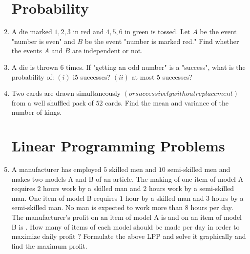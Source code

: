 \documentclass[12pt,-letter paper]{article}
\providecommand{\brak}[1]{\ensuremath{\left(#1\right)}}
\providecommand{\brak}[1]{\ensuremath{\left(#1\right)}}
\begin{document}
\begin{enumerate}
\section{Probability}
\item A die marked $1, 2, 3$ in red and $4, 5, 6$ in green is tossed. Let $A$ be the event "number is even" and $B$ be the event "number is marked red." Find whether the events $A$ and $B$ are independent or not.
\item A die is thrown 6 times. If "getting an odd number" is a "success", what is the probability of:
\brak{i} i5 successes?
\brak{ii} at most 5 successes?
\item Two cards are drawn simultaneously \brak{or successively without replacement} from a well shuffled pack of $52$ cards. Find the mean and variance of the number of kings.
\section{Linear Programming Problems}
\item A manufacturer has employed $5$ skilled men and $10$ semi-skilled men and makes two models A and B of an article. The making of one item of model A requires $2$ hours work by a skilled man and $2$ hours work by a semi-skilled man. One item of model B requires $1$ hour by a skilled man and $3$ hours by a semi-skilled man. No man is expected to work more than $8$ hours per day. The manufacturer's profit on an item of model A is  and on an item of model B is . How many of items of each model should be made per day in order to maximize daily profit ? Formulate the above LPP and solve it graphically and find the maximum profit.
\end{enumerate}
\end{document}
